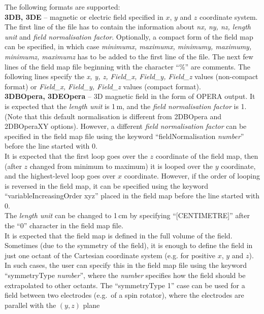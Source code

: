 \documentclass[twoside]{dis04}
\begin{document}
\begin{description}
\begin{itemize}
		The following formats are supported:\\
		{\bf 3DB, 3DE} -- magnetic or electric field specified in $x$, $y$ and $z$
			coordinate system.  The first line of the file has to contain
			the information about \emph{nx, ny, nz, length unit} and 
			\emph{field normalisation factor}.  Optionally, a compact form
			of the field map can be specified, in which case
			\emph{minimumx, maximumx, minimumy, maximumy, minimumz, maximumz}
			has to be added to the first line of the file.
			The next few lines of the field map file beginning with
			the character ``\%'' are comments.
			The following lines specify the \emph{x, y, z, Field\_x, Field\_y, Field\_z}
			values (non-compact format) or \emph{Field\_x, Field\_y, Field\_z} values
			(compact format).\\
		{\bf 3DBOpera, 3DEOpera} -- 3D magnetic field in the form of OPERA output.
			It is expected that the \emph{length unit} is 1\,m, and
			the \emph{field normalisation factor} is 1. (Note that this default
                        normalisation is different from 2DBOpera and 2DBOperaXY options).
			However, a different \emph{field normalisation factor} can be specified
			in the field map file using the keyword ``fieldNormalisation \emph{number}'' 
                        before the line started with 0.\\
			It is expected that the first loop goes over the $z$ coordinate of the field map,
			then (after $z$ changed from minimum to maximum) it is looped over the $y$ coordinate,
			and the highest-level loop goes over $x$ coordinate.  However, if the order
			of looping is reversed in the field map, it can be specified using the
			keyword ``variableIncreasingOrder  xyz'' placed in the field map before 
			the line started with 0.\\
			The \emph{length unit} can be changed to 1\,cm by specifying ``[CENTIMETRE]''
			after the ``0'' character in the field map file.\\
			It is expected that the field map is defined in the full volume of the field.
			Sometimes (due to the symmetry of the field), it is enough to define the
			field in just one octant of the Cartesian coordinate system (e.g. for positive
			$x$, $y$ and $z$).  In such cases, the user can specify this in the field map
			file using the keyword ``symmetryType \emph{number}'', where the \emph{number}
			specifies how the field should be extrapolated to other octants.  
			The ``symmetryType 1'' case can be used for a field between two electrodes
			(e.g.\ of a spin rotator), where the electrodes are parallel with the $(y,z)$ plane

\end{itemize}
\end{description}
\end{document}
